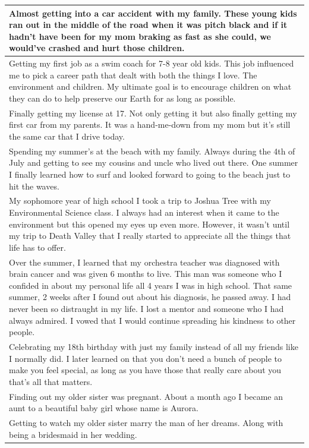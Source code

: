 \documentclass[
  .7em,
  letterpaper,
  DIV=11,
  numbers=noendperiod]{scrartcl}
\begin{document}
\begin{table}
\begin{tabular}{l}
\hline
Almost getting into a car accident with my family. These young kids ran out in the middle of the road when it was pitch black and if it hadn't have been for my mom braking as fast as she could, we would've crashed and hurt those children.\\
\hline
Getting my first job as a swim coach for 7-8 year old kids. This job influenced me to pick a career path that dealt with both the things I love. The environment and children. My ultimate goal is to encourage children on what they can do to help preserve our Earth for as long as possible.\\
\hline
Finally getting my license at 17. Not only getting it but also finally getting my first car from my parents. It was a hand-me-down from my mom but it's still the same car that I drive today.\\
\hline
Spending my summer's at the beach with my family. Always during the 4th of July and getting to see my cousins and uncle who lived out there. One summer I finally learned how to surf and looked forward to going to the beach just to hit the waves.\\
\hline
My sophomore year of high school I took a trip to Joshua Tree with my Environmental Science class. I always had an interest when it came to the environment but this opened my eyes up even more. However, it wasn't until my trip to Death Valley that I really started to appreciate all the things that life has to offer.\\
\hline
Over the summer, I learned that my orchestra teacher was diagnosed with brain cancer and was given 6 months to live. This man was someone who I confided in about my personal life all 4 years I was in high school. That same summer, 2 weeks after I found out about his diagnosis, he passed away. I had never been so distraught in my life. I lost a mentor and someone who I had always admired. I vowed that I would continue spreading his kindness to other people.\\
\hline
Celebrating my 18th birthday with just my family instead of all my friends like I normally did. I later learned on that you don't need a bunch of people to make you feel special, as long as you have those that really care about you that's all that matters.\\
\hline
Finding out my older sister was pregnant. About a month ago I became an aunt to a beautiful baby girl whose name is Aurora.\\
\hline
Getting to watch my older sister marry the man of her dreams. Along with being a bridesmaid in her wedding.\\

\end{tabular}
\end{table}
\end{document}
